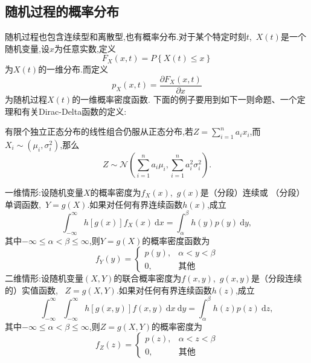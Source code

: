 \documentclass[cn,10pt,citestyle=gb7714-2015,bibstyle=gb7714-2015]{elegantbook}
\newcommand{\md}{\ \mathrm{d}}
\begin{document}
\subsection{随机过程的概率分布}
随机过程也包含连续型和离散型,也有概率分布.对于某个特定时刻$t$,\ $X(t)$是一个随机变量,设$x$为任意实数,定义
\begin{equation}
  F_X(x,t)=P\left\{X(t)\leqslant x\right\}
\end{equation}
为$X(t)$的一维分布.而定义
\begin{equation}
  p_X(x,t)=\frac{\partial F_X(x,t)}{\partial x}
\end{equation}
为随机过程$X(t)$的一维概率密度函数.
下面的例子要用到如下一则命题、一个定理和有关\textup{Dirac-Delta}函数的定义:
\begin{proposition}[正态分布的再生性]\label{pro:norm-linear}
  有限个独立正态分布的线性组合仍服从正态分布,若$Z=\sum_{i=1}^na_ix_i$,而$X_i\sim(\mu_i,\sigma_i^2)$,那么
  \[
      Z\sim\mathcal{N}\left(\sum_{i=1}^na_i\mu_i,\sum_{i=1}^na_i^2\sigma_i^2\right).
  \]
\end{proposition}
\begin{theorem}[积分转化法]\label{thm:integral-exchange}
  一维情形:设随机变量$X$的概率密度为$f_X(x)$,\ $g(x)$是（分段）连续或
  （分段）单调函数,\ $Y=g(X)$.如果对任何有界连续函数$h(x)$,成立
  \begin{equation}
    \int_{-\infty}^\infty h[g(x)]f_X(x)\md x=\int_\alpha^\beta h(y)p(y)\md y,
  \end{equation}
  其中$-\infty\leqslant\alpha<\beta\leqslant\infty$,则$Y=g(X)$的概率密度函数为
  \begin{equation}
    f_Y(y)=\begin{cases}
      p(y),&\alpha<y<\beta\\
      0,&\text{其他}
    \end{cases}
  \end{equation}
  二维情形:设随机变量$(X,Y)$的联合概率密度为$f(x,y)$,\ $g(x,y)$是（分段连续的）实值函数,
  \ $Z=g(X,Y)$.如果对任何有界连续函数$h(z)$,成立
  \begin{equation}
    \int_{-\infty}^\infty\!\int_{-\infty}^\infty h[g(x,y)]f(x,y)\md x\!\md y=\int_\alpha^\beta h(z)p(z)\md z,
  \end{equation}
  其中$-\infty\leqslant\alpha<\beta\leqslant\infty$,则$Z=g(X,Y)$的概率密度为
  \begin{equation}
    f_Z(z)=\begin{cases}
      p(z),&\alpha<z<\beta\\
      0,&\text{其他}
    \end{cases}
  \end{equation}
\end{theorem}
\end{document}
